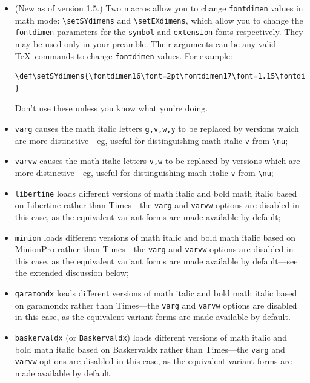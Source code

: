 \documentclass[11pt]{article}
\theoremstyle{oldplain}
\theoremstyle{plain}
\begin{document}
\begin{itemize}
\[\sum \Sumop \sum \smallsum\]
Similarly, there are \verb|\smallprod| and \verb|\smallcoprod| which, along with \verb|\smallsum|, are of class {\tt mathop}, unlike their Greek letter equivalents.
\item (New as of version 1.5.) Two macros allow you to change {\tt fontdimen} values in math mode: \verb|\setSYdimens| and \verb|\setEXdimens|, which allow you to change the {\tt fontdimen} parameters for the {\tt symbol} and {\tt extension} fonts respectively. They may be used only in your preamble. Their arguments can be any valid \TeX\ commands to change {\tt fontdimen} values. For example:
\begin{verbatim}
\def\setSYdimens{\fontdimen16\font=2pt\fontdimen17\font=1.15\fontdimen17\font }
\end{verbatim}
Don't use these unless you know what you're doing.
\item {\tt varg} causes the math italic letters \verb|g,v,w,y| to be replaced by versions which are more distinctive---eg, useful for distinguishing math italic \verb|v| from \verb|\nu|;
\item {\tt varvw} causes the math italic letters \verb|v,w| to be replaced by versions which are more distinctive---eg, useful for distinguishing math italic \verb|v| from \verb|\nu|;
\item {\tt libertine} loads different versions of math italic and bold math italic based on \textsf{Libertine} rather than \textsf{Times}---the {\tt varg} and {\tt varvw} options are disabled in this case, as the equivalent variant forms are made available by default;
\item {\tt minion} loads different versions of math italic and bold math italic based on \textsf{MinionPro} rather than \textsf{Times}---the {\tt varg} and {\tt varvw} options are disabled in this case, as the equivalent variant forms are made available by default---see the extended discussion below;
\item {\tt garamondx} loads different versions of math italic and bold math italic based on \textsf{garamondx} rather than \textsf{Times}---the {\tt varg} and {\tt varvw} options are disabled in this case, as the equivalent variant forms are made available by default.
\item {\tt baskervaldx} (or {\tt Baskervaldx}) loads different versions of math italic and bold math italic based on \textsf{Baskervaldx} rather than \textsf{Times}---the {\tt varg} and {\tt varvw} options are disabled in this case, as the equivalent variant forms are made available by default.

\end{itemize}
\end{document}
